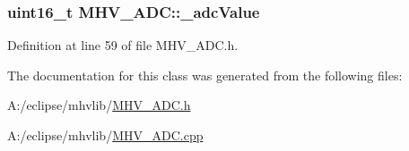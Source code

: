 \hypertarget{class_m_h_v___a_d_c_a5b4912e06e7c9c39637fa1d4f3e00ef7}{
\subsubsection[{\-\_\-adc\-Value}]{\setlength{\rightskip}{0pt plus 5cm}uint16\-\_\-t M\-H\-V\-\_\-\-A\-D\-C\-::\-\_\-adc\-Value\hspace{0.3cm}{\ttfamily [protected]}}}\label{class_m_h_v___a_d_c_a5b4912e06e7c9c39637fa1d4f3e00ef7}


Definition at line 59 of file M\-H\-V\-\_\-\-A\-D\-C.\-h.



The documentation for this class was generated from the following files\-:\begin{DoxyCompactItemize}
\item 
A\-:/eclipse/mhvlib/\hyperlink{_m_h_v___a_d_c_8h}{M\-H\-V\-\_\-\-A\-D\-C.\-h}\item 
A\-:/eclipse/mhvlib/\hyperlink{_m_h_v___a_d_c_8cpp}{M\-H\-V\-\_\-\-A\-D\-C.\-cpp}\end{DoxyCompactItemize}
